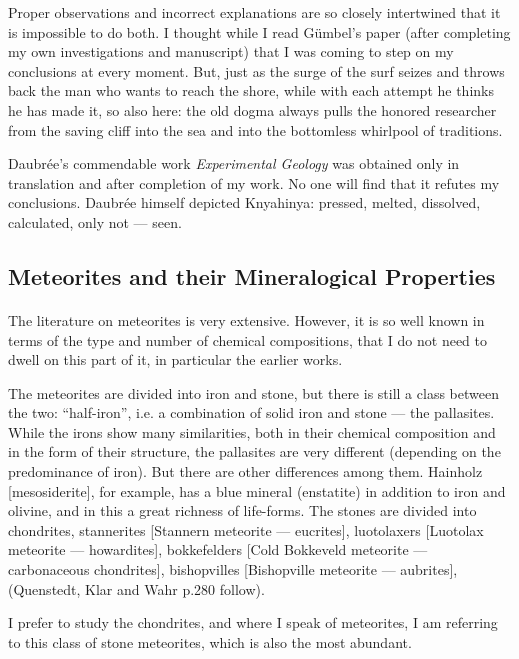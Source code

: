 \documentclass[a4paper, 12pt, oneside]{article}
\begin{document}
Proper observations and incorrect explanations are so closely intertwined that it is impossible to do both. I thought while I read Gümbel's paper (after completing my own investigations and manuscript) that I was coming to step on my conclusions at every moment. But, just as the surge of the surf seizes and throws back the man who wants to reach the shore, while with each attempt he thinks he has made it, so also here: the old dogma always pulls the honored researcher from the saving cliff into the sea and into the bottomless whirlpool of traditions.

Daubrée's commendable work \emph{Experimental Geology} was obtained only in translation and after completion of my work. No one will find that it refutes my conclusions. Daubrée himself depicted Knyahinya: pressed, melted, dissolved, calculated, only not — seen.
\clearpage
\subsection{Meteorites and their Mineralogical Properties}
\paragraph{}
The literature on meteorites is very extensive. However, it is so well known in terms of the type and number of chemical compositions, that I do not need to dwell on this part of it, in particular the earlier works.

The meteorites are divided into iron and stone, but there is still a class between the two: ``half-iron'', i.e. a combination of solid iron and stone — the pallasites. While the irons show many similarities, both in their chemical composition and in the form of their structure, the pallasites are very different (depending on the predominance of iron). But there are other differences among them. Hainholz [mesosiderite], for example, has a blue mineral (enstatite) in addition to iron and olivine, and in this a great richness of life-forms. The stones are divided into chondrites, stannerites [Stannern meteorite — eucrites], luotolaxers [Luotolax meteorite — howardites], bokkefelders [Cold Bokkeveld meteorite — carbonaceous chondrites], bishopvilles [Bishopville meteorite — aubrites], (Quenstedt, Klar and Wahr p.280 follow).

I prefer to study the chondrites, and where I speak of meteorites, I am referring to this class of stone meteorites, which is also the most abundant.
\end{document}
